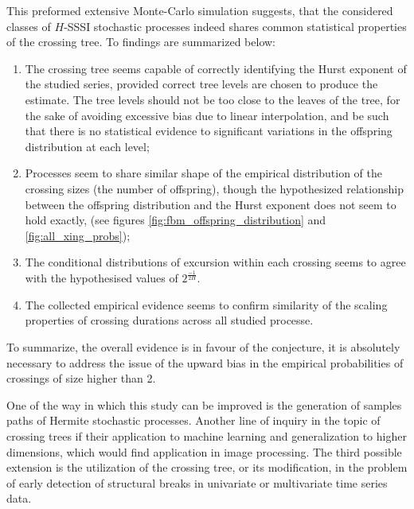 \documentclass[a4paper]{article}
\begin{document}
This preformed extensive Monte-Carlo simulation suggests, that the considered
classes of $H$-SSSI stochastic processes indeed shares common statistical properties
of the crossing tree. To findings are summarized below: \begin{enumerate}
	\item The crossing tree seems capable of correctly identifying the Hurst
	exponent of the studied series, provided correct tree levels are chosen to
	produce the estimate. The tree levels should not be too close to the leaves
	of the tree, for the sake of avoiding excessive bias due to linear interpolation,
	and be such that there is no statistical evidence to significant variations
	in the offspring distribution at each level;
	\item Processes seem to share similar shape of the empirical distribution of
	the crossing sizes (the number of offspring), though the hypothesized
	relationship between the offspring distribution and the Hurst exponent
	does not seem to hold exactly, (see figures \ref{fig:fbm_offspring_distribution}
	and \ref{fig:all_xing_probs});
	\item The conditional distributions of excursion within each crossing seems
	to agree with the hypothesised values of $2^{\frac{-1}{2H}}$.
	\item The collected empirical evidence seems to confirm similarity of the scaling
	properties of crossing durations across all studied processe.
\end{enumerate}
To summarize, the overall evidence is in favour of the conjecture, it is absolutely
necessary to address the issue of the upward bias in the empirical probabilities of
crossings of size higher than 2.

One of the way in which this study can be improved is the generation of samples paths
of Hermite stochastic processes. Another line of inquiry in the topic of crossing trees
if their application to machine learning and generalization to higher dimensions, which
would find application in image processing. The third possible extension is the utilization
of the crossing tree, or its modification, in the problem of early detection of structural
breaks in univariate or multivariate time series data.




\end{document}
